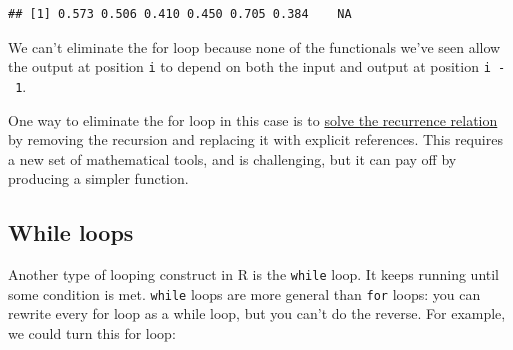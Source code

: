 \begin{Shaded}
\begin{Highlighting}[]
\StringTok{ }
\StringTok{ }\NormalTok{(}\OperatorTok{+}\StringTok{ }\NormalTok{)}
   
    \OperatorTok{==}\StringTok{ }\NormalTok{) \{}
\StringTok{ }
\NormalTok{    \} }\NormalTok{ \{}
\StringTok{ }\OperatorTok{*}\StringTok{ }\OperatorTok{+}\StringTok{ }\NormalTok{(} \OperatorTok{-}\StringTok{ }\OperatorTok{*}\StringTok{ }\NormalTok{s[i }\OperatorTok{-}\StringTok{ }\NormalTok{]}
\NormalTok{    \}}
\NormalTok{  \}}
\NormalTok{\}}
\StringTok{ }\NormalTok{(}\NormalTok{)}
\NormalTok{)}
\end{Highlighting}
\end{Shaded}

\begin{verbatim}
## [1] 0.573 0.506 0.410 0.450 0.705 0.384    NA
\end{verbatim}

We can't eliminate the for loop because none of the functionals we've
seen allow the output at position \texttt{i} to depend on both the input
and output at position \texttt{i\ -\ 1}.

One way to eliminate the for loop in this case is to
\href{http://en.wikipedia.org/wiki/Recurrence_relation\#Solving}{solve
the recurrence relation} by removing the recursion and replacing it with
explicit references. This requires a new set of mathematical tools, and
is challenging, but it can pay off by producing a simpler function.

\hypertarget{while-loops}{%
\subsection{While loops}\label{while-loops}}

Another type of looping construct in R is the \texttt{while} loop. It
keeps running until some condition is met. \texttt{while} loops are more
general than \texttt{for} loops: you can rewrite every for loop as a
while loop, but you can't do the reverse. For example, we could turn
this for loop:  


